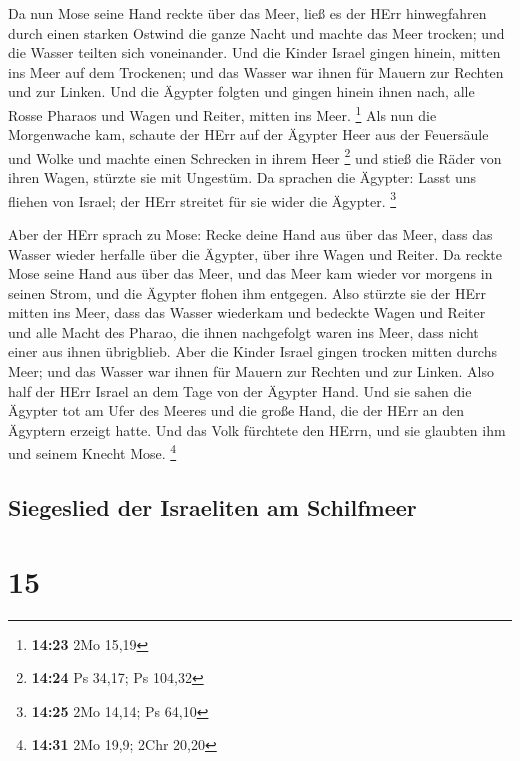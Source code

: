  Da nun Mose seine Hand reckte über das Meer, ließ es der
HErr hinwegfahren durch einen starken Ostwind die ganze Nacht und machte
das Meer trocken; und die Wasser teilten sich voneinander.
 Und die Kinder Israel gingen hinein, mitten ins Meer auf
dem Trockenen; und das Wasser war ihnen für Mauern zur Rechten und zur
Linken.  Und die Ägypter folgten und gingen hinein ihnen
nach, alle Rosse Pharaos und Wagen und Reiter, mitten ins Meer.
\footnote{\textbf{14:23} 2Mo 15,19}  Als nun die
Morgenwache kam, schaute der HErr auf der Ägypter Heer aus der
Feuersäule und Wolke und machte einen Schrecken in ihrem Heer
\footnote{\textbf{14:24} Ps 34,17; Ps 104,32}  und stieß
die Räder von ihren Wagen, stürzte sie mit Ungestüm. Da sprachen die
Ägypter: Lasst uns fliehen von Israel; der HErr streitet für sie wider
die Ägypter. \footnote{\textbf{14:25} 2Mo 14,14; Ps 64,10}

 Aber der HErr sprach zu Mose: Recke deine Hand aus über
das Meer, dass das Wasser wieder herfalle über die Ägypter, über ihre
Wagen und Reiter.  Da reckte Mose seine Hand aus über das
Meer, und das Meer kam wieder vor morgens in seinen Strom, und die
Ägypter flohen ihm entgegen. Also stürzte sie der HErr mitten ins Meer,
 dass das Wasser wiederkam und bedeckte Wagen und Reiter
und alle Macht des Pharao, die ihnen nachgefolgt waren ins Meer, dass
nicht einer aus ihnen übrigblieb.  Aber die Kinder Israel
gingen trocken mitten durchs Meer; und das Wasser war ihnen für Mauern
zur Rechten und zur Linken.  Also half der HErr Israel an
dem Tage von der Ägypter Hand. Und sie sahen die Ägypter tot am Ufer des
Meeres  und die große Hand, die der HErr an den Ägyptern
erzeigt hatte. Und das Volk fürchtete den HErrn, und sie glaubten ihm
und seinem Knecht Mose. \footnote{\textbf{14:31} 2Mo 19,9; 2Chr 20,20}

\hypertarget{siegeslied-der-israeliten-am-schilfmeer}{%
\subsection{Siegeslied der Israeliten am
Schilfmeer}\label{siegeslied-der-israeliten-am-schilfmeer}}

\hypertarget{section-14}{%
\section{15}\label{section-14}}

